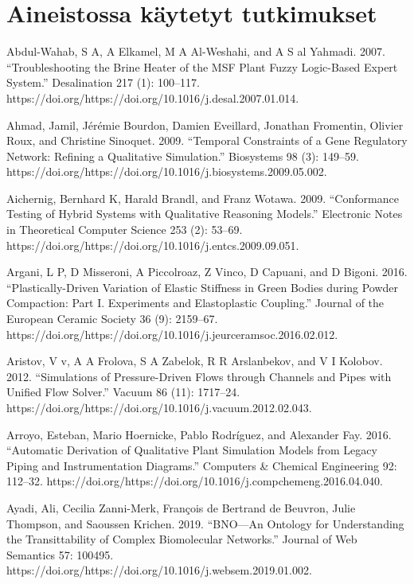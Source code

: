 \documentclass[utf8]{gradu3}
\begin{document}
\printbibliography

\appendix
\section{Aineistossa käytetyt tutkimukset}

Abdul-Wahab, S A, A Elkamel, M A Al-Weshahi, and A S al Yahmadi. 2007. “Troubleshooting the Brine Heater of the MSF Plant Fuzzy Logic-Based Expert System.” Desalination 217 (1): 100–117. https://doi.org/https://doi.org/10.1016/j.desal.2007.01.014.

Ahmad, Jamil, Jérémie Bourdon, Damien Eveillard, Jonathan Fromentin, Olivier Roux, 
and Christine Sinoquet. 2009. 
“Temporal Constraints of a Gene Regulatory Network: 
Refining a Qualitative Simulation.” Biosystems 98 (3): 149–59.
https://doi.org/https://doi.org/10.1016/j.biosystems.2009.05.002.

Aichernig, Bernhard K, Harald Brandl, and Franz Wotawa. 2009. “Conformance Testing of Hybrid Systems with Qualitative Reasoning Models.” Electronic Notes in Theoretical Computer Science 253 (2): 53–69. https://doi.org/https://doi.org/10.1016/j.entcs.2009.09.051.

Argani, L P, D Misseroni, A Piccolroaz, Z Vinco, D Capuani, and D Bigoni. 2016. “Plastically-Driven Variation of Elastic Stiffness in Green Bodies during Powder Compaction: Part I. Experiments and Elastoplastic Coupling.” Journal of the European Ceramic Society 36 (9): 2159–67. https://doi.org/https://doi.org/10.1016/j.jeurceramsoc.2016.02.012.

Aristov, V v, A A Frolova, S A Zabelok, R R Arslanbekov, and V I Kolobov. 2012. “Simulations of Pressure-Driven Flows through Channels and Pipes with Unified Flow Solver.” Vacuum 86 (11): 1717–24. https://doi.org/https://doi.org/10.1016/j.vacuum.2012.02.043.

Arroyo, Esteban, Mario Hoernicke, Pablo Rodríguez, and Alexander Fay. 2016. “Automatic Derivation of Qualitative Plant Simulation Models from Legacy Piping and Instrumentation Diagrams.” Computers \& Chemical Engineering 92: 112–32. https://doi.org/https://doi.org/10.1016/j.compchemeng.2016.04.040.

Ayadi, Ali, Cecilia Zanni-Merk, François de Bertrand de Beuvron, Julie Thompson, and Saoussen Krichen. 2019. “BNO—An Ontology for Understanding the Transittability of Complex Biomolecular Networks.” Journal of Web Semantics 57: 100495. https://doi.org/https://doi.org/10.1016/j.websem.2019.01.002.
\end{document}
